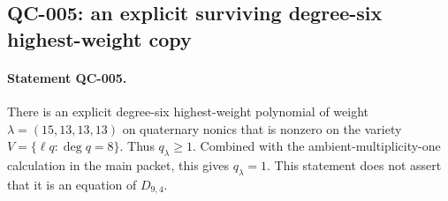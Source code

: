 \subsection{QC-005: an explicit surviving degree-six highest-weight copy}

\paragraph{Statement QC-005.}
There is an explicit degree-six highest-weight polynomial of weight
$\lambda=(15,13,13,13)$ on quaternary nonics that is nonzero on
the variety $V=\{\ell q:\deg q=8\}$. Thus $q_\lambda\geq1$.
Combined with the ambient-multiplicity-one calculation in the
main packet, this gives $q_\lambda=1$.
This statement does not assert that it is an equation of $D_{9,4}$.

